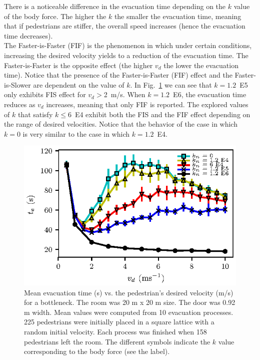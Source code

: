 \documentclass[preprint,12pt]{elsarticle}
\begin{document}
There is a noticeable difference in the evacuation time depending on the $k$ value of the body force. The higher the $k$ the smaller the evacuation time, meaning that if pedestrians are stiffer, the overall speed increases (hence the evacuation time decreases).\\

The Faster-is-Faster (FIF) is the phenomenon in which under certain conditions, increasing the desired velocity yields to a reduction of the evacuation time. The Faster-is-Faster is the opposite effect (the higher $v_d$ the lower the evacuation time).  Notice that the presence of the Faster-is-Faster (FIF) effect and the Faster-is-Slower are dependent on the value of $k$. In Fig.~\ref{vd_vs_te} we can see that $k=1.2$~E5 only exhibits FIS effect for $v_d>$2~m/s. When $k=1.2$~E6, the evacuation time reduces as $v_d$ increases, meaning that only FIF is reported. The explored values of $k$ that satisfy $k \leq 6$~E4 exhibit both the FIS and the FIF effect depending on the range of desired velocities. Notice that the behavior of the case in which $k = 0$ is very similar to the case in which $k = 1.2$~E4.\\
 

\begin{figure}[htbp!]
\centering
\includegraphics[width=0.7\columnwidth]
{./vd_vs_te_N225.eps}
\caption{\label{vd_vs_te}Mean evacuation time (s) vs. the pedestrian’s desired velocity (m/s) for a bottleneck. The room was 20 m x 20 m size. The door was 0.92 m width. Mean values were computed from 10 evacuation processes. 225 pedestrians were initially placed in a square lattice with a random initial velocity. Each process was finished when 158 pedestrians left the room. The different symbols indicate the $k$ value corresponding to the body force (see the label). }
\end{figure}
\end{document}
